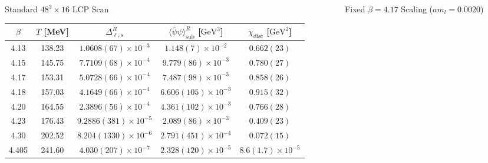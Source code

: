 \documentclass[10pt, aspectratio=169]{beamer} %
\begin{document}
\begin{frame}[noframenumbering]
\vfill
\begin{columns}[T]
    \begin{column}{0.53\textwidth}
        \setlength{\leftskip}{0pt}
        \centering
        {\scriptsize Standard $48^3 \times 16$ LCP Scan} \\
        \vspace{0.2em}
        \tiny
        \setlength{\tabcolsep}{2.2pt}
        \renewcommand{\arraystretch}{1.15}
        \begin{tabular}{ccccc}
            \toprule
            $\beta$ & $T$ [MeV] & $\Delta_{\ell,s}^R$ & $\langle\bar{\psi}\psi\rangle_{\mathrm{sub}}^R$ [$\mathrm{GeV}^3$] & $\chi_{\mathrm{disc}}$ [$\mathrm{GeV}^2$] \\
            \midrule
            4.13  & 138.23 & $1.0608(67)\times 10^{-3}$ & $1.148(7)\times 10^{-2}$ & $0.662(23)$ \\
            4.15  & 145.75 & $7.7109(68)\times 10^{-4}$ & $9.779(86)\times 10^{-3}$ & $0.780(27)$ \\
            4.17  & 153.31 & $5.0728(66)\times 10^{-4}$ & $7.487(98)\times 10^{-3}$ & $0.858(26)$ \\
            4.18  & 157.03 & $4.1649(66)\times 10^{-4}$ & $6.606(105)\times 10^{-3}$ & $0.915(32)$ \\
            4.20  & 164.55 & $2.3896(56)\times 10^{-4}$ & $4.361(102)\times 10^{-3}$ & $0.766(28)$ \\
            4.23  & 176.43 & $9.2886(381)\times 10^{-5}$ & $2.089(86)\times 10^{-3}$ & $0.409(23)$ \\
            4.30  & 202.52 & $8.204(1330)\times 10^{-6}$ & $2.791(451)\times 10^{-4}$ & $0.072(15)$ \\
            4.405 & 241.60 & $4.030(207)\times 10^{-7}$ & $2.328(120)\times 10^{-5}$ & $8.6(1.7)\times 10^{-5}$ \\
            \bottomrule
        \end{tabular}
    \end{column}
    \begin{column}{0.45\textwidth}
        \setlength{\leftskip}{0pt}
        \centering
        {\scriptsize Fixed $\beta=4.17$ Scaling ($am_l=0.0020$)} \\
        \vspace{0.2em}
        \tiny
        \setlength{\tabcolsep}{2.2pt}
        \renewcommand{\arraystretch}{1.15}
        \begin{tabular}{cccc}

\end{tabular}
\end{column}
\end{columns}
\end{frame}
\end{document}
